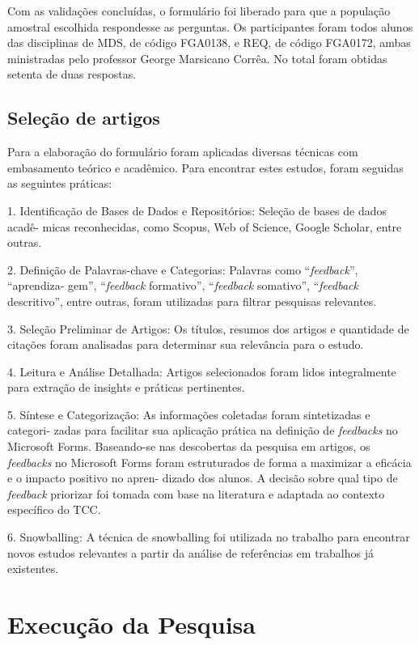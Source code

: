Com as validações concluídas, o formulário foi liberado para que a população amostral escolhida respondesse as perguntas. Os participantes foram todos alunos das disciplinas de MDS, de código FGA0138, e REQ, de código FGA0172, ambas ministradas pelo professor George Marsicano Corrêa. No total foram obtidas setenta de duas respostas.

\subsection{Seleção de artigos}

Para a elaboração do formulário foram aplicadas diversas técnicas com embasamento teórico e acadêmico. Para encontrar estes estudos, foram seguidas as seguintes práticas:

1. Identificação de Bases de Dados e Repositórios: Seleção de bases de dados acadê-
micas reconhecidas, como Scopus, Web of Science, Google Scholar, entre outras.

2. Definição de Palavras-chave e Categorias: Palavras como ``\textit{feedback}'', ``aprendiza-
gem'', ``\textit{feedback} formativo'', ``\textit{feedback} somativo'', ``\textit{feedback} descritivo'', entre outras, foram
utilizadas para filtrar pesquisas relevantes.

3. Seleção Preliminar de Artigos: Os títulos, resumos dos artigos e quantidade de
citações foram analisadas para determinar sua relevância para o estudo.

4. Leitura e Análise Detalhada: Artigos selecionados foram lidos integralmente para
extração de insights e práticas pertinentes.

5. Síntese e Categorização: As informações coletadas foram sintetizadas e categori-
zadas para facilitar sua aplicação prática na definição de \textit{feedbacks} no Microsoft Forms.
Baseando-se nas descobertas da pesquisa em artigos, os \textit{feedbacks} no Microsoft
Forms foram estruturados de forma a maximizar a eficácia e o impacto positivo no apren-
dizado dos alunos. A decisão sobre qual tipo de \textit{feedback} priorizar foi tomada com base
na literatura e adaptada ao contexto específico do TCC.

6. Snowballing:  A técnica de snowballing foi utilizada no trabalho para encontrar novos estudos relevantes a partir da análise de referências em trabalhos já existentes.

\section{Execução da Pesquisa}

